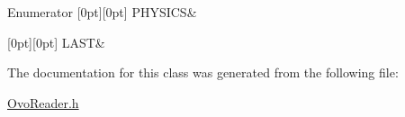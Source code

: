 \begin{DoxyEnumFields}{Enumerator}
[0pt][0pt]{}\mbox{\label{classOvObject_a43751fbd68ebd5f7f02cb452b11e01c4a947832f2ea8e42b1bd9ec7792656fa11}} 
P\+H\+Y\+S\+I\+CS&\\
\hline

[0pt][0pt]{}\mbox{\label{classOvObject_a43751fbd68ebd5f7f02cb452b11e01c4af447f5c03508de4d88e340390ba7c78f}} 
L\+A\+ST&\\
\hline

\end{DoxyEnumFields}


The documentation for this class was generated from the following file\+:\begin{DoxyCompactItemize}
\item 
\hyperlink{OvoReader_8h}{Ovo\+Reader.\+h}\end{DoxyCompactItemize}
